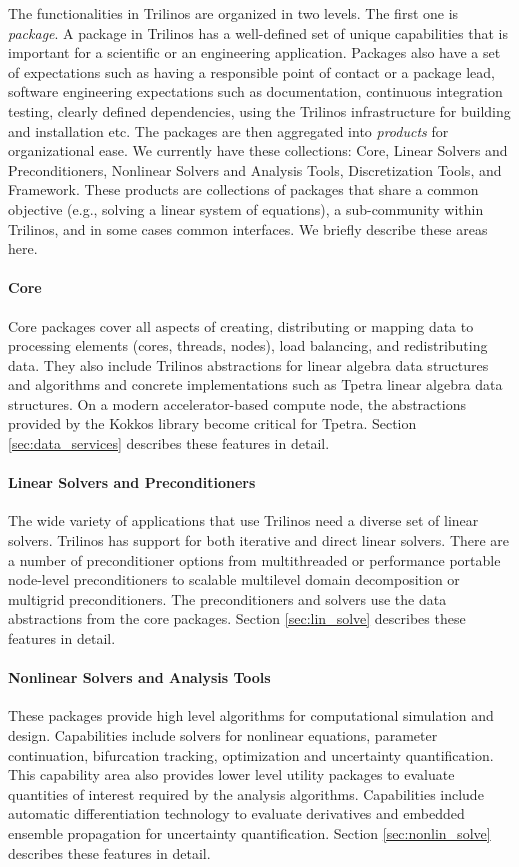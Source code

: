 The functionalities in Trilinos are organized in two levels. The first one is \textit{package}. A package in Trilinos has a well-defined set of unique capabilities that is important for a scientific or an engineering application. Packages also have a set of expectations such as having a responsible point of contact or a package lead, software engineering expectations such as documentation, continuous integration testing, clearly defined dependencies, using the Trilinos infrastructure for building and installation etc. The packages are then aggregated into \emph{products} for organizational ease. We currently have these collections: Core, Linear Solvers and Preconditioners, Nonlinear Solvers and Analysis Tools, Discretization Tools, and Framework. These products are collections of packages that share a common objective (e.g., solving a linear system of equations), a sub-community within Trilinos, and in some cases common interfaces. We briefly describe these areas here.

\paragraph{Core} Core packages cover all aspects of creating, distributing or mapping data to processing elements (cores, threads, nodes), load balancing, and redistributing data. They also include Trilinos abstractions for linear algebra data structures and algorithms and concrete implementations such as Tpetra linear algebra data structures. On a modern accelerator-based compute node, the abstractions provided by the Kokkos library become critical for Tpetra. Section \ref{sec:data_services} describes these features in detail.
 
\paragraph{Linear Solvers and Preconditioners} The wide variety of applications that use Trilinos need a diverse set of linear solvers. Trilinos has support for both iterative and direct linear solvers. There are a number of preconditioner options from multithreaded or performance portable node-level preconditioners to scalable multilevel domain decomposition or multigrid preconditioners. The preconditioners and solvers use the data abstractions from the core packages. Section \ref{sec:lin_solve} describes these features in detail.

\paragraph{Nonlinear Solvers and Analysis Tools} These packages provide high level algorithms for computational simulation and design. Capabilities include solvers for nonlinear equations, parameter continuation, bifurcation tracking, optimization and uncertainty quantification. This capability area also provides lower level utility packages to evaluate quantities of interest required by the analysis algorithms. Capabilities include automatic differentiation technology to evaluate derivatives and embedded ensemble propagation for uncertainty quantification. Section \ref{sec:nonlin_solve} describes these features in detail.

